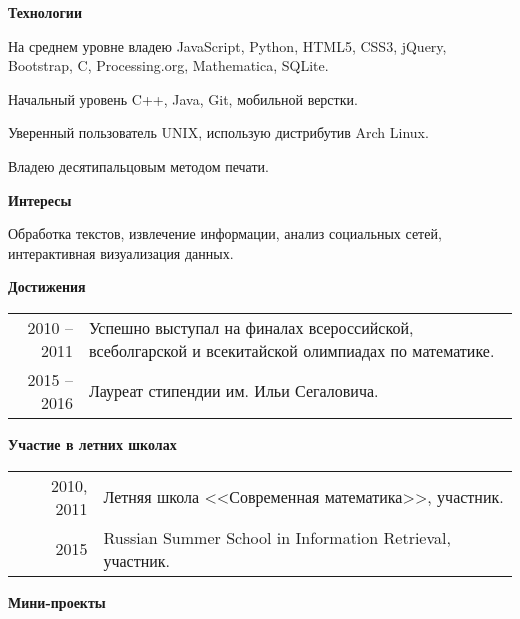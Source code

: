 \documentclass[11pt]{article}
\begin{document}
{\bfseries Технологии}
\vspace{10pt}

На среднем уровне владею JavaScript, Python, HTML5, CSS3, jQuery, Bootstrap,
C, Processing.org, Mathematica, SQLite.

Начальный уровень C++, Java, Git, мобильной верстки.

Уверенный пользователь UNIX, использую дистрибутив Arch Linux.

Владею десятипальцовым методом печати.

\vspace{30pt}

{\bfseries Интересы}
\vspace{10pt}

Обработка текстов, извлечение информации, анализ социальных сетей, интерактивная визуализация данных.
\vspace{30pt}

{\bfseries Достижения}
\vspace{10pt}

\begin{tabular}{r p{11.5cm}}
\footnotesize{2010 -- 2011} & Успешно выступал на финалах всероссийской, всеболгарской и всекитайской олимпиадах по математике. \\
\footnotesize{2015 -- 2016} & Лауреат стипендии им. Ильи Сегаловича.\\
\end{tabular}

\vspace{30pt}

{\bfseries Участие в летних школах}
\vspace{10pt}

\begin{tabular}{r p{11.5cm}}
\footnotesize{2010, 2011} & Летняя школа <<Современная математика>>, участник. \\
\footnotesize{2015} & Russian Summer School in Information Retrieval, участник.\\
\end{tabular}
\vspace{30pt}

{\bfseries Мини-проекты}
\vspace{10pt}
\end{document}
